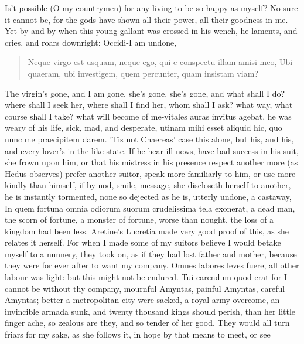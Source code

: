 Is't possible (O my countrymen) for any living to be so happy as
myself? No sure it cannot be, for the gods have shown all their power,
all their goodness in me. Yet by and by when this young gallant was
crossed in his wench, he laments, and cries, and roars downright:
Occidi-I am undone,

\begin{latin}
\begin{verse}
Neque virgo est usquam, neque ego, qui e conspectu illam amisi meo,
Ubi quaeram, ubi investigem, quem percunter, quam insistam viam?
\end{verse}
\end{latin}

The virgin's gone, and I am gone, she's gone, she's gone, and what
shall I do? where shall I seek her, where shall I find her, whom shall
I ask? what way, what course shall I take? what will become of
me-vitales auras invitus agebat, he was weary of his life, sick,
mad, and desperate, utinam mihi esset aliquid hic, quo nunc me
praecipitem darem. 'Tis not Chaereas' case this alone, but his, and
his, and every lover's in the like state. If he hear ill news, have bad
success in his suit, she frown upon him, or that his mistress in his
presence respect another more (as Hedus observes) prefer another
suitor, speak more familiarly to him, or use more kindly than himself,
if by nod, smile, message, she discloseth herself to another, he is
instantly tormented, none so dejected as he is, utterly undone, a
castaway, In quem fortuna omnia odiorum suorum crudelissima tela
exonerat, a dead man, the scorn of fortune, a monster of fortune, worse
than nought, the loss of a kingdom had been less. Aretine's
Lucretia made very good proof of this, as she relates it herself. For
when I made some of my suitors believe I would betake myself to a
nunnery, they took on, as if they had lost father and mother, because
they were for ever after to want my company. Omnes labores leves fuere,
all other labour was light: but this might not be endured. Tui
carendum quod erat-for I cannot be without thy company, mournful
Amyntas, painful Amyntas, careful Amyntas; better a metropolitan city
were sacked, a royal army overcome, an invincible armada sunk, and
twenty thousand kings should perish, than her little finger ache, so
zealous are they, and so tender of her good. They would all turn friars
for my sake, as she follows it, in hope by that means to meet, or see
